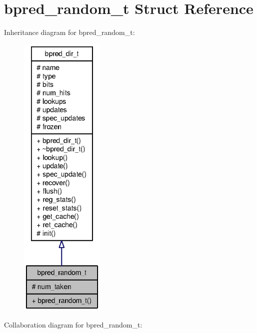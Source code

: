 \section{bpred\_\-random\_\-t Struct Reference}
\label{structbpred__random__t}
Inheritance diagram for bpred\_\-random\_\-t:\nopagebreak
\begin{figure}[H]
\begin{center}
\leavevmode
\includegraphics[height=400pt]{structbpred__random__t__inherit__graph}
\end{center}
\end{figure}
Collaboration diagram for bpred\_\-random\_\-t:\nopagebreak

